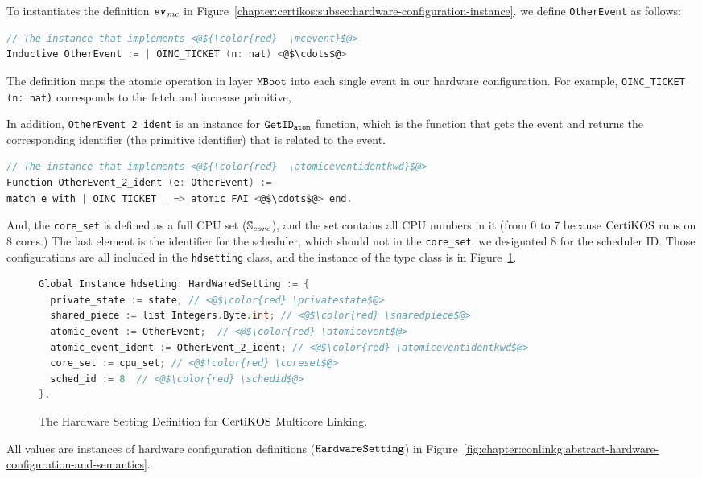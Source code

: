 To instantiates the definition ${{\mathrm{\texttt{\textbf{\textit{ev}}}}}_{mc}}$ in Figure~\ref{chapter:certikos:subsec:hardware-configuration-instance}.
we define \lstinline$OtherEvent$ as follows:
\begin{lstlisting}[language=C, deletekeywords={for}]
// The instance that implements <@${\color{red}  \mcevent}$@>
Inductive OtherEvent := | OINC_TICKET (n: nat) <@$\cdots$@> 
\end{lstlisting}
The definition maps the atomic operation in layer ${\mathrm{\texttt{MBoot}}}$ into each single event in our hardware configuration.
For example, \lstinline$OINC_TICKET (n: nat)$ corresponds to the fetch and increase primitive,

In addition, \lstinline$OtherEvent_2_ident$ is an instance for ${{\mathrm{\texttt{GetID}}}_{{\mathrm{\texttt{atom}}}}}$ function, which is the function
that gets the event and returns the corresponding identifier (the primitive identifier) that is related to the event.
\begin{lstlisting}[language=C]
// The instance that implements <@${\color{red}  \atomiceventidentkwd}$@>
Function OtherEvent_2_ident (e: OtherEvent) := 
match e with | OINC_TICKET _ => atomic_FAI <@$\cdots$@> end.
\end{lstlisting}
And, the \lstinline$core_set$ is defined as a full CPU set (${\mathbb{S}_{core}}$), and 
the set contains all CPU numbers in it (from 0 to 7 because $\mathrm{CertiKOS}$ runs on 8 cores.)
The last element is the identifier for 
the scheduler, which should not in the \lstinline$core_set$. 
we designated 8 for the scheduler ID.
Those configurations are all included in the 
\lstinline$hdsetting$ class, and the instance of the type class
is in Figure~\ref{fig:chapter:ceritkos:instances-of-abstract-hardware-setting}.
\begin{figure}
\begin{lstlisting}[language=C, deletekeywords={int}]
Global Instance hdseting: HardWaredSetting := {
  private_state := state; // <@$\color{red} \privatestate$@>
  shared_piece := list Integers.Byte.int; // <@$\color{red} \sharedpiece$@>
  atomic_event := OtherEvent;  // <@$\color{red} \atomicevent$@>
  atomic_event_ident := OtherEvent_2_ident; // <@$\color{red} \atomiceventidentkwd$@>
  core_set := cpu_set; // <@$\color{red} \coreset$@>
  sched_id := 8  // <@$\color{red} \schedid$@>
}.
\end{lstlisting}
\caption{The Hardware Setting Definition for $\mathrm{CertiKOS}$ Multicore Linking.}
\label{fig:chapter:ceritkos:instances-of-abstract-hardware-setting}
\end{figure}
All values are instances of 
hardware configuration definitions (${\mathrm{\texttt{HardwareSetting}}}$) in Figure~\ref{fig:chapter:conlinkg:abstract-hardware-configuration-and-semantics}. 

